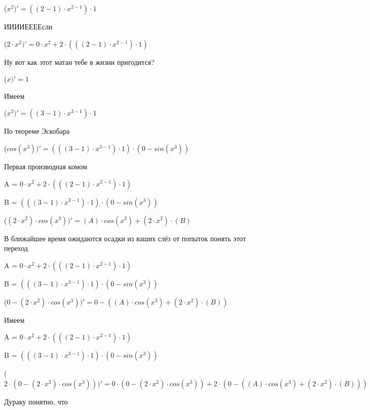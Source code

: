 \documentclass[12pt,a4paper,fleqn]{article}
\begin{document}
\begin{center}
 ($x^{2})'
  = ((2-1) \cdot x^{2-1}) \cdot 1$\end{center}
ИИИИЕЕЕЕсли\cite{link3}

\begin{center}
 ($2 \cdot x^{2})'
  = 0 \cdot x^{2}+2 \cdot (((2-1) \cdot x^{2-1}) \cdot 1)$\end{center}
Ну вот как этот матан тебе в жизни пригодится?

\begin{center}
 ($x)'
  = 1$\end{center}
Имеем

\begin{center}
 ($x^{3})'
  = ((3-1) \cdot x^{3-1}) \cdot 1$\end{center}
По теореме Эскобара

\begin{center}
 ($cos(x^{3}))'
  = (((3-1) \cdot x^{3-1}) \cdot 1) \cdot (0-sin(x^{3}))$\end{center}
Первая производная комом\cite{link2}

\begin{center}
A = $0 \cdot x^{2}+2 \cdot (((2-1) \cdot x^{2-1}) \cdot 1)$\end{center}
\begin{center}
B = $(((3-1) \cdot x^{3-1}) \cdot 1) \cdot (0-sin(x^{3}))$\end{center}
\begin{center}
 ($(2 \cdot x^{2}) \cdot cos(x^{3}))'
  = (A) \cdot cos(x^{3})+(2 \cdot x^{2}) \cdot (B)$\end{center}
В ближайшее время ожидаются осадки из ваших слёз от попыток понять этот переход

\begin{center}
A = $0 \cdot x^{2}+2 \cdot (((2-1) \cdot x^{2-1}) \cdot 1)$\end{center}
\begin{center}
B = $(((3-1) \cdot x^{3-1}) \cdot 1) \cdot (0-sin(x^{3}))$\end{center}
\begin{center}
 ($0-(2 \cdot x^{2}) \cdot cos(x^{3}))'
  = 0-((A) \cdot cos(x^{3})+(2 \cdot x^{2}) \cdot (B))$\end{center}
Имеем

\begin{center}
A = $0 \cdot x^{2}+2 \cdot (((2-1) \cdot x^{2-1}) \cdot 1)$\end{center}
\begin{center}
B = $(((3-1) \cdot x^{3-1}) \cdot 1) \cdot (0-sin(x^{3}))$\end{center}
\begin{center}
 ($2 \cdot (0-(2 \cdot x^{2}) \cdot cos(x^{3})))'
  = 0 \cdot (0-(2 \cdot x^{2}) \cdot cos(x^{3}))+2 \cdot (0-((A) \cdot cos(x^{3})+(2 \cdot x^{2}) \cdot (B)))$\end{center}
Дураку понятно, что
\end{document}

